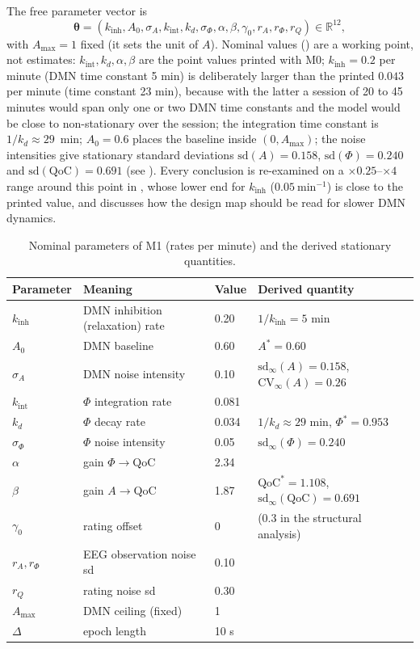 \documentclass[12pt,a4paper]{article}
\theoremstyle{plain}
\theoremstyle{definition}
\theoremstyle{remark}
\newcommand{\R}{\mathbb{R}}
\newcommand{\QoC}{\mathrm{QoC}}
\newcommand{\kinh}{k_{\mathrm{inh}}}
\newcommand{\kint}{k_{\mathrm{int}}}
\newcommand{\kd}{k_{d}}
\newcommand{\Amax}{A_{\max}}
\newcommand{\sA}{\sigma_{A}}
\newcommand{\sPhi}{\sigma_{\Phi}}
\newcommand{\rA}{r_{A}}
\newcommand{\rPhi}{r_{\Phi}}
\newcommand{\rQ}{r_{Q}}
\newcommand{\thetav}{\boldsymbol{\theta}}
\begin{document}
The free parameter vector is
\begin{equation}
  \thetav=(\kinh,A_0,\sA,\kint,\kd,\sPhi,\alpha,\beta,\gamma_0,\rA,\rPhi,\rQ)\in\R^{12},
\end{equation}
with $\Amax=1$ fixed (it sets the unit of $A$). Nominal values () are a working point, not estimates: $\kint,\kd,\alpha,\beta$ are the point values printed with M0; $\kinh=0.2$ per minute (DMN time constant 5 min) is deliberately larger than the printed $0.043$ per minute (time constant 23 min), because with the latter a session of 20 to 45 minutes would span only one or two DMN time constants and the model would be close to non-stationary over the session; the integration time constant is $1/\kd\approx 29$~min; $A_0=0.6$ places the baseline inside $(0,\Amax)$; the noise intensities give stationary standard deviations $\mathrm{sd}(A)=0.158$, $\mathrm{sd}(\Phi)=0.240$ and $\mathrm{sd}(\QoC)=0.691$ (see ). Every conclusion is re-examined on a $\times0.25$--$\times4$ range around this point in , whose lower end for $\kinh$ ($0.05\ \mathrm{min^{-1}}$) is close to the printed value, and  discusses how the design map should be read for slower DMN dynamics.

\begin{table}[t]
\centering\small
\caption{Nominal parameters of M1 (rates per minute) and the derived stationary quantities.}
\label{tab:nominal}
\setlength{\tabcolsep}{4pt}
\begin{tabular}{llll}
\toprule
Parameter & Meaning & Value & Derived quantity \\
\midrule
$\kinh$ & DMN inhibition (relaxation) rate & 0.20 & $1/\kinh = 5$ min \\
$A_0$ & DMN baseline & 0.60 & $A^*=0.60$ \\
$\sA$ & DMN noise intensity & 0.10 & $\mathrm{sd}_\infty(A)=0.158$, $\mathrm{CV}_\infty(A)=0.26$ \\
$\kint$ & $\Phi$ integration rate & 0.081 & \\
$\kd$ & $\Phi$ decay rate & 0.034 & $1/\kd\approx 29$ min, $\Phi^*=0.953$ \\
$\sPhi$ & $\Phi$ noise intensity & 0.05 & $\mathrm{sd}_\infty(\Phi)=0.240$ \\
$\alpha$ & gain $\Phi\to\QoC$ & 2.34 & \\
$\beta$ & gain $A\to\QoC$ & 1.87 & $\QoC^*=1.108$, $\mathrm{sd}_\infty(\QoC)=0.691$ \\
$\gamma_0$ & rating offset & 0 & (0.3 in the structural analysis) \\
$\rA,\rPhi$ & EEG observation noise sd & 0.10 & \\
$\rQ$ & rating noise sd & 0.30 & \\
$\Amax$ & DMN ceiling (fixed) & 1 & \\
$\Delta$ & epoch length & 10 s & \\
\bottomrule
\end{tabular}
\end{table}
\end{document}

